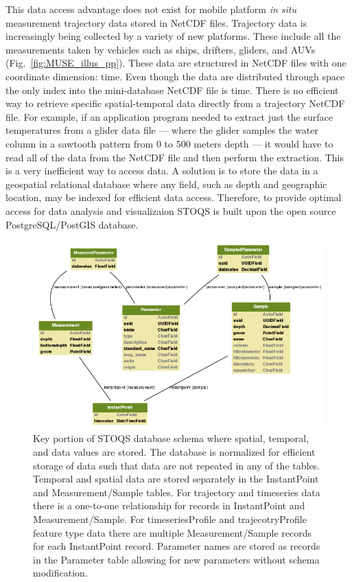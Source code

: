 \documentclass[conference]{IEEEtran}
\begin{document}
This data access advantage does not exist for mobile platform \textit{in situ} measurement trajectory data stored in NetCDF files. Trajectory data is increasingly being collected by a variety of new platforms. These include all the measurements taken by vehicles such as ships, drifters, gliders, and AUVs (Fig.~\ref{fig:MUSE_illus_pp}). These data are structured in NetCDF files with one coordinate dimension: time. Even though the data are distributed through space the only index into the mini-database NetCDF file is time. There is no efficient way to retrieve specific spatial-temporal data directly from a trajectory NetCDF file. For example, if an application program needed to extract just the surface temperatures from a glider data file --- where the glider samples the water column in a sawtooth pattern from 0 to 500 meters depth --- it would have to read all of the data from the NetCDF file and then perform the extraction. This is a very inefficient way to access data. A solution is to store the data in a geospatial relational database where any field, such as depth and geographic location,  may be indexed for efficient data access. Therefore, to provide optimal access for data analysis and visualizaion STOQS is built upon the open source PostgreSQL/PostGIS database.

\begin{figure}[hbp]
\centering
\includegraphics[scale=0.5]{stoqs_simple_model.png}
\caption{Key portion of STOQS database schema where spatial, temporal, and data values are stored. The database is normalized for efficient storage of data such that data are not repeated in any of the tables. Temporal and spatial data are stored separately in the InstantPoint and Measurement/Sample tables. For trajectory and timeseries data there is a one-to-one relationship for records in InstantPoint and Measurement/Sample. For timeseriesProfile and trajecotryProfile feature type data there are multiple Measurement/Sample records for each InstantPoint record. Parameter names are stored as records in the Parameter table allowing for new parameters without schema modification.}
\label{fig:stoqs_simple_model}
\end{figure}
\end{document}
